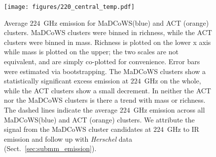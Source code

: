 \documentclass[longauth]{aa} %
\newcommand{\madcows}{MaDCoWS\xspace}
\begin{document}

\begin{figure}
    \centering
    \texttt{[image: figures/220\_central\_temp.pdf]}
    \caption{Average $224$~GHz emission for \madcows (blue) and ACT (orange) clusters. \madcows clusters were binned in richness, while the ACT clusters were binned in mass. Richness is plotted on the lower x axis while mass is plotted on the upper; the two scales are not equivalent, and are simply co-plotted for convenience. Error bars were estimated via bootstrapping. The \madcows clusters show a statistically significant excess emission at $224$~GHz on the whole, while the ACT clusters show a small decrement. In neither the ACT nor the \madcows clusters is there a trend with mass or richness. The dashed lines indicate the average $224$~GHz emission across all \madcows (blue) and ACT (orange) clusters. We attribute the signal from the \madcows cluster candidates at $224$~GHz to IR emission and follow up with {\it Herschel} data (Sect.~\ref{sec:submm_emission}).}
    
    \label{fig:220_scaling}
\end{figure}

\end{document}

